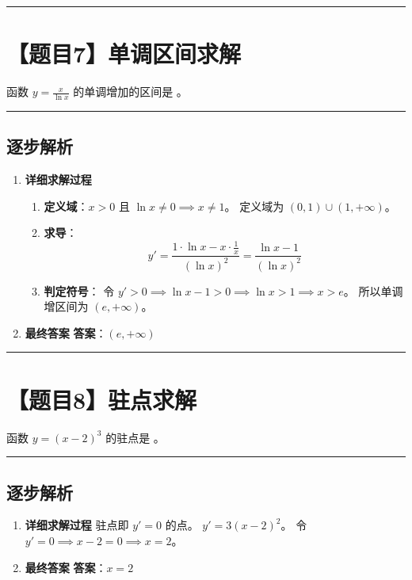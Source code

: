 \documentclass[UTF8]{ctexart}
\newenvironment{redenv}{\color{red}}{}
\newenvironment{detailedanalysis}{%
    \color{red}
    \begin{enumerate}[label=\textbf{第\arabic*步：}, leftmargin=*, align=left, itemsep=1.5ex]
}{%
    \end{enumerate}
}
\newcommand{\problemrule}{\noindent\rule{\textwidth}{1.5pt}\vspace{-0.8em}}
\newcommand{\analysisrule}{\noindent\rule{\textwidth}{0.8pt}\vspace{-0.8em}}
\newcommand{\blank}[1]{\underline{\hspace{#1}}}
\begin{document}
\problemrule
\section*{【题目7】单调区间求解}
函数 $ y=\frac{x}{\ln x} $ 的单调增加的区间是 \blank{2cm}。

\begin{redenv}
\analysisrule
\subsection*{逐步解析}

\begin{detailedanalysis}
\item \textbf{详细求解过程}
\begin{enumerate}[label=(\arabic*)]
\item \textbf{定义域}：$x > 0$ 且 $\ln x \neq 0 \implies x \neq 1$。
定义域为 $(0, 1) \cup (1, +\infty)$。
\item \textbf{求导}：
$$ y' = \frac{1 \cdot \ln x - x \cdot \frac{1}{x}}{(\ln x)^2} = \frac{\ln x - 1}{(\ln x)^2} $$
\item \textbf{判定符号}：
令 $y' > 0 \implies \ln x - 1 > 0 \implies \ln x > 1 \implies x > e$。
所以单调增区间为 $(e, +\infty)$。
\end{enumerate}

\item \textbf{最终答案}
\textbf{答案}：$ (e, +\infty) $
\end{detailedanalysis}
\end{redenv}

\problemrule
\section*{【题目8】驻点求解}
函数 $ y=(x-2)^{3} $ 的驻点是 \blank{2cm}。

\begin{redenv}
\analysisrule
\subsection*{逐步解析}

\begin{detailedanalysis}
\item \textbf{详细求解过程}
驻点即 $y' = 0$ 的点。
$y' = 3(x-2)^2$。
令 $y' = 0 \implies x - 2 = 0 \implies x = 2$。

\item \textbf{最终答案}
\textbf{答案}：$ x=2 $
\end{detailedanalysis}
\end{redenv}
\end{document}
